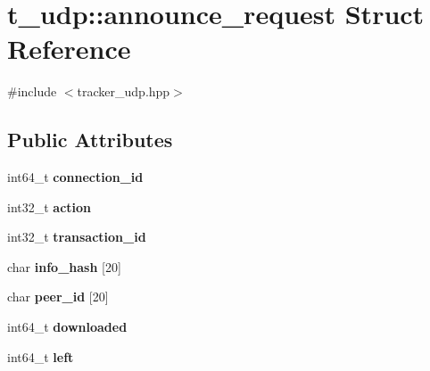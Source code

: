 \hypertarget{structt__udp_1_1announce__request}{}\section{t\+\_\+udp\+:\+:announce\+\_\+request Struct Reference}
\label{structt__udp_1_1announce__request}


{\ttfamily \#include $<$tracker\+\_\+udp.\+hpp$>$}

\subsection*{Public Attributes}
\begin{DoxyCompactItemize}
\item 
\mbox{\label{structt__udp_1_1announce__request_a1daf1aff59d4e4061dc90deff3a07119}} 
int64\+\_\+t {\bfseries connection\+\_\+id}
\item 
\mbox{\label{structt__udp_1_1announce__request_a75a0d8d81ce170a16301549822774445}} 
int32\+\_\+t {\bfseries action}
\item 
\mbox{\label{structt__udp_1_1announce__request_a0e68c76c036e588342843ab71127911b}} 
int32\+\_\+t {\bfseries transaction\+\_\+id}
\item 
\mbox{\label{structt__udp_1_1announce__request_a177ed60da46299915733f148ed40698f}} 
char {\bfseries info\+\_\+hash} \mbox{[}20\mbox{]}
\item 
\mbox{\label{structt__udp_1_1announce__request_a8896ff01c5461e7ab37207e99eeb7c73}} 
char {\bfseries peer\+\_\+id} \mbox{[}20\mbox{]}
\item 
\mbox{\label{structt__udp_1_1announce__request_aa3d7e9a19acc2be647a9136c51d15f08}} 
int64\+\_\+t {\bfseries downloaded}
\item 
\mbox{\label{structt__udp_1_1announce__request_a10783305bf9bec9f5fc4f1e74fb6c5a6}} 
int64\+\_\+t {\bfseries left}
\item 

\end{DoxyCompactItemize}
